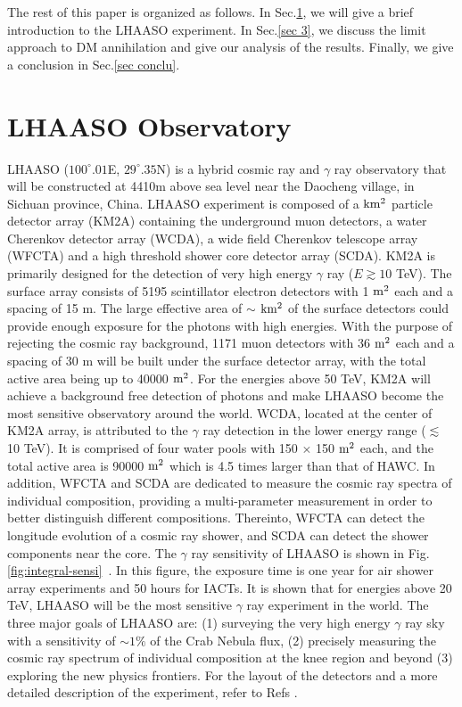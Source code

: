 \documentclass[12pt,prd,showpacs,amsmath,amssymb,aps,floats,floatfix,nofootinbib]{revtex4-1}
\begin{document}
The rest of this paper is organized as follows. In Sec.\ref{sec 2}, we will give a brief introduction to the LHAASO experiment. In Sec.\ref{sec 3}, we discuss the limit approach to DM annihilation and give our analysis of the results. Finally, we give a conclusion in Sec.\ref{sec conclu}.


\section{LHAASO Observatory}\label{sec 2}
LHAASO ($100^{\circ}.01$E, $29^{\circ}.35$N) is a hybrid cosmic ray and $\gamma$ ray observatory that will be constructed at 4410m above sea level near the Daocheng village, in Sichuan province, China. LHAASO experiment is composed of a $\rm km^{2}$ particle detector array (KM2A) containing the underground muon detectors, a water Cherenkov detector array (WCDA), a wide field Cherenkov telescope array (WFCTA) and a high threshold shower core detector array (SCDA). KM2A is primarily designed for the detection of very high energy $\gamma$ ray ($E\gtrsim10$ TeV). The surface array consists of 5195 scintillator electron detectors with 1 $\rm m^{2}$ each and a spacing of 15 m. The large effective area of $\sim$ $\rm km^{2}$ of the surface detectors could provide enough exposure for the photons with high energies. With the purpose of rejecting the cosmic ray background, 1171 muon detectors with 36 $\rm m^{2}$ each and a spacing of 30 m will be built under the surface detector array, with the total active area being up to 40000 $\rm m^{2}$. For the energies above 50 TeV, KM2A will achieve a background free detection of photons and make LHAASO become the most sensitive observatory around the world. WCDA, located at the center of KM2A array, is attributed to the $\gamma$ ray detection in the lower energy range ($\lesssim$ 10 TeV). It is comprised of four water pools with 150 $\times$ 150 $\rm m^{2}$ each, and the total active area is 90000 $\rm m^{2}$ which is 4.5 times larger than that of HAWC. In addition, WFCTA and SCDA are dedicated to measure the cosmic ray spectra of individual composition, providing a multi-parameter measurement in order to better distinguish different compositions. Thereinto, WFCTA can detect the longitude evolution of a cosmic ray shower, and SCDA can detect the shower components near the core. The $\gamma$ ray sensitivity of LHAASO is shown in Fig.\ref{fig:integral-sensi}~\cite{Cao:2014rla}. In this figure, the exposure time is one year for air shower array experiments and 50 hours for IACTs. It is shown that for energies above 20 TeV, LHAASO will be the most sensitive $\gamma$ ray experiment in the world. The three major goals of LHAASO are: (1) surveying the very high energy $\gamma$ ray sky with a sensitivity of $\sim1\%$ of the Crab Nebula flux, (2) precisely measuring the cosmic ray spectrum of individual composition at the knee region and beyond (3) exploring the new physics frontiers. For the layout of the detectors and a more detailed description of the experiment, refer to Refs \cite{Cao:2010zz,Cao:2014rla}.
\end{document}
